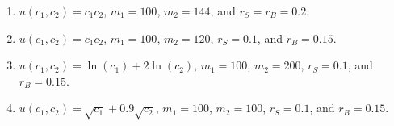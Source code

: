 \documentclass[11pt]{article}
\begin{document}
\begin{enumerate}
    \begin{enumerate}
        \item $u(c_{1},c_{2})=c_{1}c_{2}$, $m_{1}=100$, $m_{2}=144$, and $r_{S}=r_{B}=0.2$.

        \item $u(c_{1},c_{2})=c_{1}c_{2}$, $m_{1}=100$, $m_{2}=120$, $r_{S}=0.1$, and $r_{B}=0.15$.

        \item $u(c_{1},c_{2})=\ln(c_{1})+2\ln(c_{2})$, $m_{1}=100$, $m_{2}=200$, $r_{S}=0.1$, and $r_{B}=0.15$.

        \item $u(c_{1},c_{2})=\sqrt{c_{1}}+0.9\sqrt{c_{2}}$, $m_{1}=100$, $m_{2}=100$, $r_{S}=0.1$, and $r_{B}=0.15$.
    \end{enumerate}




\end{enumerate}
\end{document}
